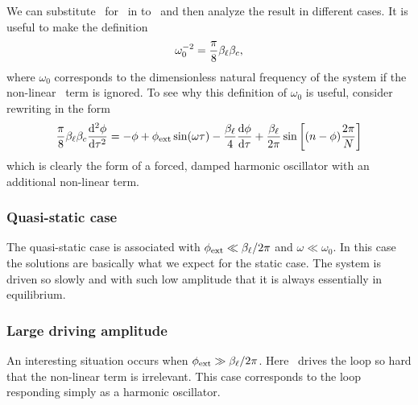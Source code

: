 We can substitute \ for \phiext\ in to
\ and then analyze the result in different cases. 
It is useful to make the definition
\begin{equation}
\omega_0^{-2} = {\pi\over 8}\beta_\ell\beta_c , 
\end{equation}
where $\omega_0$
 corresponds to the dimensionless natural frequency of the system
if the non-linear \jj\ term is ignored. 
To see why this definition of $\omega_0$ is useful, consider 
rewriting  in the form
%
\begin{equation}
\label{eqn:ode_reform}
{\pi\over 8}\beta_\ell\beta_c {\mathrm{d}^2\phi\over\mathrm{d}\tau^2} = 
-\phi + \phi_{\mathrm{ext}}\sin(\omega\tau)-{\beta_\ell\over 4}{\mathrm{d}\phi\over\mathrm{d}\tau}
+ {\beta_\ell\over 2\pi}\sin\left[ (n-\phi){2\pi\over N} \right]
\end{equation}
%
which is clearly the form of a forced, damped harmonic
oscillator with an additional non-linear term. 


\subsubsection{Quasi-static case}

The quasi-static case is associated with $\phi_{\mathrm{ext}} \ll {\ensuremath{\beta_\ell}/ 2 \pi}$ 
and 
$\omega \ll \omega_0$.
In this case the solutions are basically what we
expect for the static case. The system is driven so slowly and with such
low amplitude that it is always essentially in equilibrium. 

%
% 
%

\subsubsection{Large driving amplitude}

An interesting situation occurs when $\phi_{\mathrm{ext}} \gg \beta_\ell / 2 \pi$. 
Here \phiext\ drives the loop so hard that the non-linear term is
irrelevant. This case corresponds to the loop responding simply as
a harmonic oscillator. 

